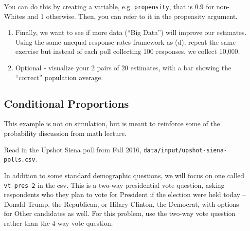 \documentclass[]{book}
\theoremstyle{definition}
\theoremstyle{definition}
\theoremstyle{definition}
\theoremstyle{remark}
\begin{document}
You can do this by creating a variable, e.g. \texttt{propensity}, that
is 0.9 for non-Whites and 1 otherwise. Then, you can refer to it in the
propensity argument.

\begin{enumerate}
\def\labelenumi{(\alph{enumi})}
\setcounter{enumi}{4}
\item
  Finally, we want to see if more data (``Big Data'') will improve our
  estimates. Using the same unequal response rates framework as (d),
  repeat the same exercise but instead of each poll collecting 100
  responses, we collect 10,000.
\item
  Optional - visualize your 2 pairs of 20 estimates, with a bar showing
  the ``correct'' population average.
\end{enumerate}

\subsection*{Conditional Proportions}\label{conditional-proportions}

This example is not on simulation, but is meant to reinforce some of the
probability discussion from math lecture.

Read in the Upshot Siena poll from Fall 2016,
\texttt{data/input/upshot-siena-polls.csv}.

In addition to some standard demographic questions, we will focus on one
called \texttt{vt\_pres\_2} in the csv. This is a two-way presidential
vote question, asking respondents who they plan to vote for President if
the election were held today -- Donald Trump, the Republican, or Hilary
Clinton, the Democrat, with options for Other candidates as well. For
this problem, use the two-way vote question rather than the 4-way vote
question.
\end{document}
